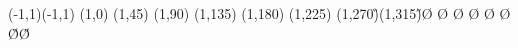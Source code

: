 \begin{zahyou*}[ul=2.5zw](-1,1)(-1,1)%
\kyokuTyoku(1,0)\A%
\kyokuTyoku(1,45)\B%
\kyokuTyoku(1,90)\C%
\kyokuTyoku(1,135)\D%
\kyokuTyoku(1,180)\E%
\kyokuTyoku(1,225)\F%
\kyokuTyoku(1,270)\G%
\kyokuTyoku(1,315)\H%
\ArrowLine\O\A
\ArrowLine\O\B
\ArrowLine\O\C
\ArrowLine\O\D
\ArrowLine\O\E
\ArrowLine\O\F
\ArrowLine\O\G
\ArrowLine\O\H
\end{zahyou*}
